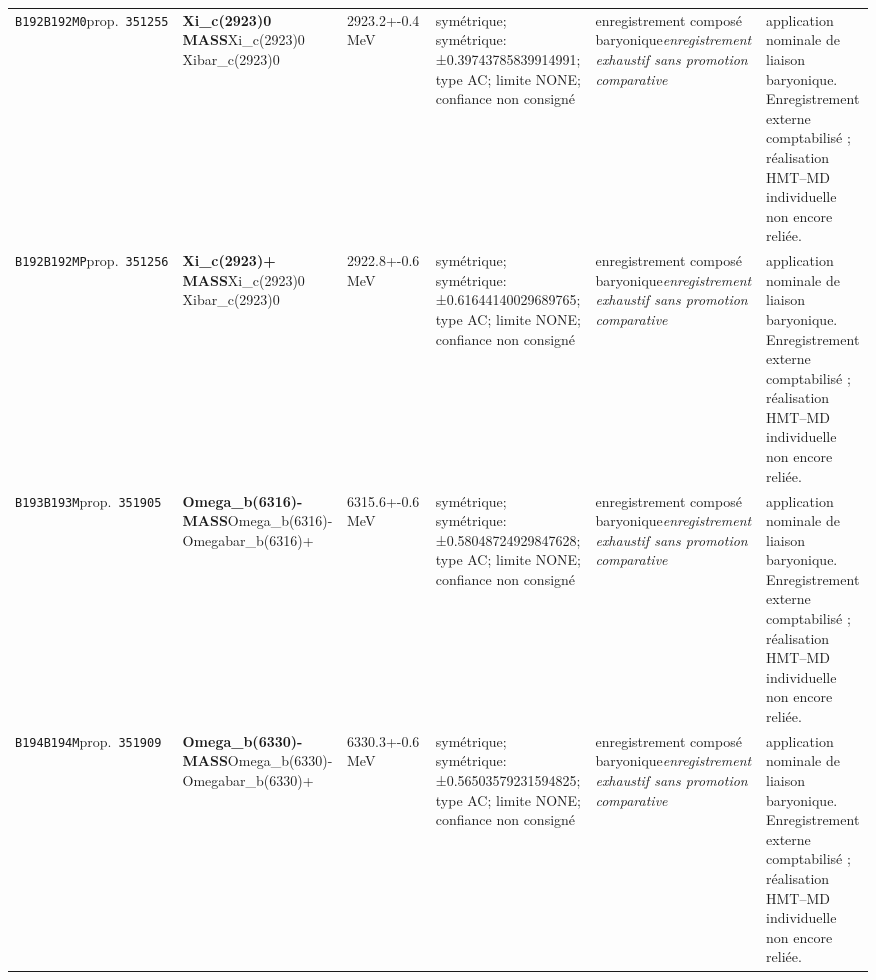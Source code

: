 \begin{landscape}
\begin{longtable}{L{1.85cm}L{4.45cm}L{2.35cm}L{4.05cm}L{3.35cm}L{7.15cm}}
\texttt{B192}\newline \texttt{B192M0}\newline prop.\ \texttt{351255} & \textbf{Xi\_\allowbreak{}c(2923)0 MASS}\newline Xi\_\allowbreak{}c(2923)0 \textbar{}\allowbreak{} Xibar\_\allowbreak{}c(2923)0 & 2923.2+-0.4\,MeV & symétrique; symétrique: ±0.39743785839914991; type AC; limite NONE; confiance non consigné & enregistrement composé baryonique\newline \emph{enregistrement exhaustif sans promotion comparative} & application nominale de liaison baryonique. Enregistrement externe comptabilisé ; réalisation HMT--MD individuelle non encore reliée. \\
\texttt{B192}\newline \texttt{B192MP}\newline prop.\ \texttt{351256} & \textbf{Xi\_\allowbreak{}c(2923)+ MASS}\newline Xi\_\allowbreak{}c(2923)0 \textbar{}\allowbreak{} Xibar\_\allowbreak{}c(2923)0 & 2922.8+-0.6\,MeV & symétrique; symétrique: ±0.61644140029689765; type AC; limite NONE; confiance non consigné & enregistrement composé baryonique\newline \emph{enregistrement exhaustif sans promotion comparative} & application nominale de liaison baryonique. Enregistrement externe comptabilisé ; réalisation HMT--MD individuelle non encore reliée. \\
\texttt{B193}\newline \texttt{B193M}\newline prop.\ \texttt{351905} & \textbf{Omega\_\allowbreak{}b(6316)- MASS}\newline Omega\_\allowbreak{}b(6316)- \textbar{}\allowbreak{} Omegabar\_\allowbreak{}b(6316)+ & 6315.6+-0.6\,MeV & symétrique; symétrique: ±0.58048724929847628; type AC; limite NONE; confiance non consigné & enregistrement composé baryonique\newline \emph{enregistrement exhaustif sans promotion comparative} & application nominale de liaison baryonique. Enregistrement externe comptabilisé ; réalisation HMT--MD individuelle non encore reliée. \\
\texttt{B194}\newline \texttt{B194M}\newline prop.\ \texttt{351909} & \textbf{Omega\_\allowbreak{}b(6330)- MASS}\newline Omega\_\allowbreak{}b(6330)- \textbar{}\allowbreak{} Omegabar\_\allowbreak{}b(6330)+ & 6330.3+-0.6\,MeV & symétrique; symétrique: ±0.56503579231594825; type AC; limite NONE; confiance non consigné & enregistrement composé baryonique\newline \emph{enregistrement exhaustif sans promotion comparative} & application nominale de liaison baryonique. Enregistrement externe comptabilisé ; réalisation HMT--MD individuelle non encore reliée. \\

\end{longtable}
\end{landscape}
